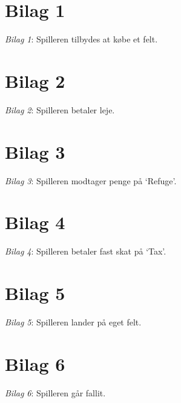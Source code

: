 \begin{appendices}
\FloatBarrier
\begin{figure}[h]
\section*{Bilag 1}\label{bilag1}
\centering
{}
\caption{\emph{Bilag 1}: Spilleren tilbydes at købe et felt.}
\end{figure}
\FloatBarrier
\begin{figure}[h]
\section*{Bilag 2}\label{bilag2}
\centering
{}
\caption{\emph{Bilag 2}: Spilleren betaler leje.}
\end{figure}
\FloatBarrier
\begin{figure}[h]
\section*{Bilag 3}\label{bilag3}
\centering
{}
\caption{\emph{Bilag 3}: Spilleren modtager penge på ‘Refuge’.}
\end{figure}
\FloatBarrier
\begin{figure}[h]
\section*{Bilag 4}\label{bilag4}
\centering
{}
\caption{\emph{Bilag 4}: Spilleren betaler fast skat på ‘Tax’.}
\end{figure}
\FloatBarrier
\begin{figure}[h]
\section*{Bilag 5}\label{bilag5}
\centering
{}
\caption{\emph{Bilag 5}: Spilleren lander på eget felt.}
\end{figure}
\FloatBarrier
\begin{figure}[h]
\section*{Bilag 6}\label{bilag6}
\centering
{}
\caption{\emph{Bilag 6}: Spilleren går fallit.}
\end{figure}
\FloatBarrier
\begin{figure}[h]

\end{figure}
\end{appendices}
